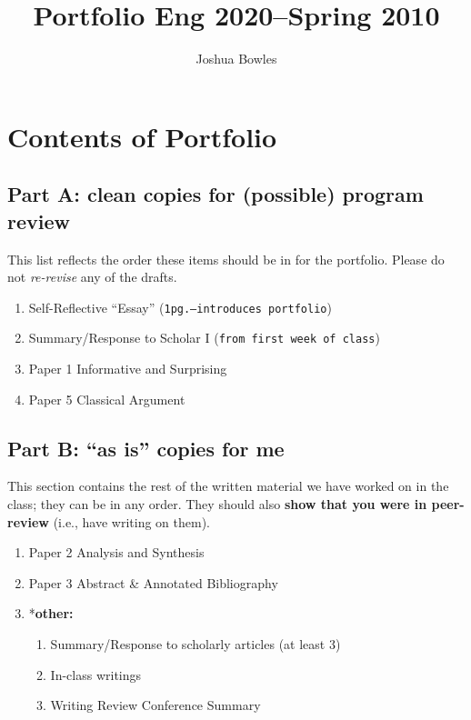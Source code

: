 \documentclass{article}
\theoremstyle{definition}
\begin{document}
\author{Joshua Bowles}
\title{Portfolio Eng 2020--Spring 2010}


\maketitle


\section{Contents of Portfolio}
\subsection{Part A: clean copies for (possible) program review}
This list reflects the order these items should be in for the portfolio. Please do not \textsl{re-revise} any of the drafts.
\begin{enumerate}
\item Self-Reflective ``Essay'' (\texttt{1pg.--introduces portfolio})
\item Summary/Response to Scholar I (\texttt{from first week of class})
\item Paper 1 {\sc Informative and Surprising}
\item Paper 5 {\sc Classical Argument}
\end{enumerate}

\subsection{Part B: ``as is'' copies for me}
This section contains the rest of the written material we have worked on in the class; they can be in any order. They should also \textbf{show that you were in peer-review} (i.e., have writing on them).
\begin{enumerate}
\item Paper 2 {\sc Analysis and Synthesis}
\item Paper 3 {\sc Abstract \& Annotated Bibliography}
\item *{\bf other:}
  \begin{enumerate}
\item Summary/Response to scholarly articles (at least 3)
\item In-class writings
\item Writing Review Conference Summary
  \end{enumerate}
\end{enumerate}
\end{document}
